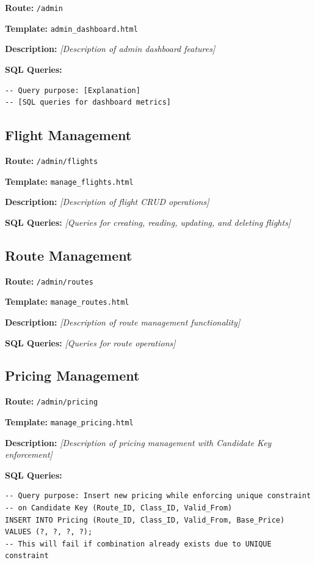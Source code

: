 \documentclass[12pt,a4paper,openany]{report}
\begin{document}
\textbf{Route:} \texttt{/admin}

\textbf{Template:} \texttt{admin\_dashboard.html}

\textbf{Description:}
\textit{[Description of admin dashboard features]}

\textbf{SQL Queries:}

\begin{lstlisting}[caption={Dashboard Statistics}]
-- Query purpose: [Explanation]
-- [SQL queries for dashboard metrics]
\end{lstlisting}

\subsection{Flight Management}

\textbf{Route:} \texttt{/admin/flights}

\textbf{Template:} \texttt{manage\_flights.html}

\textbf{Description:}
\textit{[Description of flight CRUD operations]}

\textbf{SQL Queries:}
\textit{[Queries for creating, reading, updating, and deleting flights]}

\subsection{Route Management}

\textbf{Route:} \texttt{/admin/routes}

\textbf{Template:} \texttt{manage\_routes.html}

\textbf{Description:}
\textit{[Description of route management functionality]}

\textbf{SQL Queries:}
\textit{[Queries for route operations]}

\subsection{Pricing Management}

\textbf{Route:} \texttt{/admin/pricing}

\textbf{Template:} \texttt{manage\_pricing.html}

\textbf{Description:}
\textit{[Description of pricing management with Candidate Key enforcement]}

\textbf{SQL Queries:}

\begin{lstlisting}[caption={Add New Pricing - Respects Candidate Key}]
-- Query purpose: Insert new pricing while enforcing unique constraint
-- on Candidate Key (Route_ID, Class_ID, Valid_From)
INSERT INTO Pricing (Route_ID, Class_ID, Valid_From, Base_Price)
VALUES (?, ?, ?, ?);
-- This will fail if combination already exists due to UNIQUE constraint
\end{lstlisting}
\end{document}
